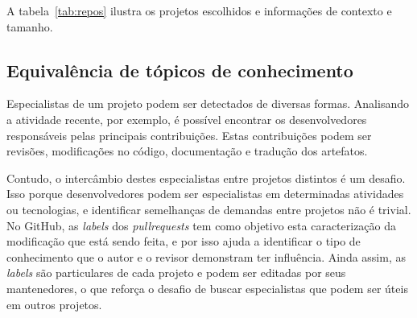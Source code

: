 \documentclass[peerreview]{acmart}
\begin{document}
A tabela~\ref{tab:repos} ilustra os projetos escolhidos e informações de contexto e tamanho.

\begin{table}[!h]

\centering
{}
\caption{Descrição dos Respositórios Selecionados}
\label{tab:repos}
\end{table}

\subsection{Equivalência de tópicos de conhecimento}

Especialistas de um projeto podem ser detectados de diversas formas. Analisando a atividade recente, por exemplo, é possível encontrar os desenvolvedores responsáveis pelas principais contribuições. Estas contribuições podem ser revisões, modificações no código, documentação e tradução dos artefatos.

Contudo, o intercâmbio destes especialistas entre projetos distintos é um desafio. Isso porque desenvolvedores podem ser especialistas em determinadas atividades ou tecnologias, e identificar semelhanças de demandas entre projetos não é trivial. No GitHub, as \textit{labels} dos \textit{pullrequests} tem como objetivo esta caracterização da modificação que está sendo feita, e por isso ajuda a identificar o tipo de conhecimento que o autor e o revisor demonstram ter influência. Ainda assim, as \textit{labels} são particulares de cada projeto e podem ser editadas por seus mantenedores, o que reforça o desafio de buscar especialistas que podem ser úteis em outros projetos.
\end{document}
